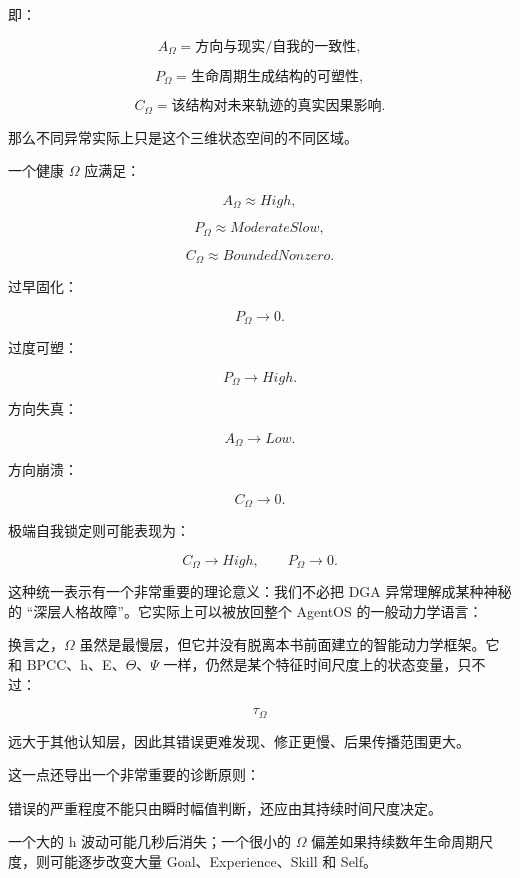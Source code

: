 即：

\[
A_\Omega
=
\text{方向与现实/自我的一致性},
\]

\[
P_\Omega
=
\text{生命周期生成结构的可塑性},
\]

\[
C_\Omega
=
\text{该结构对未来轨迹的真实因果影响}.
\]

那么不同异常实际上只是这个三维状态空间的不同区域。

一个健康 $\Omega$ 应满足：

\[
A_\Omega\approx High,
\]

\[
P_\Omega\approx ModerateSlow,
\]

\[
C_\Omega\approx BoundedNonzero.
\]

过早固化：

\[
P_\Omega\rightarrow0.
\]

过度可塑：

\[
P_\Omega\rightarrow High.
\]

方向失真：

\[
A_\Omega\rightarrow Low.
\]

方向崩溃：

\[
C_\Omega\rightarrow0.
\]

极端自我锁定则可能表现为：

\[
C_\Omega\rightarrow High,
\qquad
P_\Omega\rightarrow0.
\]

这种统一表示有一个非常重要的理论意义：我们不必把 DGA 异常理解成某种神秘的 ``深层人格故障''。它实际上可以被放回整个 AgentOS 的一般动力学语言：

\begin{statementbox}
\centering
{}
\end{statementbox}

换言之，$\Omega$ 虽然是最慢层，但它并没有脱离本书前面建立的智能动力学框架。它和 BPCC、h、E、$\Theta$、$\Psi$ 一样，仍然是某个特征时间尺度上的状态变量，只不过：

\[
\tau_\Omega
\]

远大于其他认知层，因此其错误更难发现、修正更慢、后果传播范围更大。

这一点还导出一个非常重要的诊断原则：

\begin{proposition*}
错误的严重程度不能只由瞬时幅值判断，还应由其持续时间尺度决定。
\end{proposition*}

一个大的 h 波动可能几秒后消失；一个很小的 $\Omega$ 偏差如果持续数年生命周期尺度，则可能逐步改变大量 Goal、Experience、Skill 和 Self。

